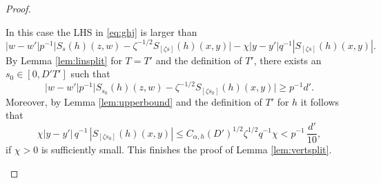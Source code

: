 \documentclass[JEP,XML,SOM,Unicode,NoEqCountersInSection]{cedram}
\newcounter{case}
\theoremstyle{definition}
\theoremstyle{plain}
\begin{document}
\begin{proof}
\begin{enumerate}
In this case the LHS in \eqref{eq:ghj} is larger than
\[
\vert w-w' \vert p^{-1} \bigl|S_{s}(h)(z,w)-\zeta^{-1/2}S_{[\zeta s]}(h)(x,y)\bigr|-\chi\vert y-y'\vert q^{-1}|S_{[\zeta s]}(h)(x,y)|.\]
By Lemma \ref{lem:linsplit} for $T=T'$ and the definition of $T'$, there exists an $s_0\in [0,D'T']$ such that
\[
\vert w-w'\vert p^{-1} \bigl|S_{s_0}(h)(z,w)-\zeta^{-1/2}S_{[\zeta s_0]}(h)(x,y)\bigr|\geq p^{-1} d'.
\]
Moreover, by Lemma \ref{lem:upperbound} and the definition of $T'$ for $h$ it follows that
\[
\chi\vert y-y'\vert\, q^{-1}\,|S_{[\zeta s_0]}(h)(x,y)|\leq C_{\alpha,h}(D')^{1/2} \zeta^{1/2} q^{-1}\chi<p^{-1} \,\frac{d'}{10},
\]
if $\chi>0$ is sufficiently small. This finishes the proof of Lemma \ref{lem:vertsplit}.\qedhere
\end{enumerate}
\end{proof}
\end{document}
